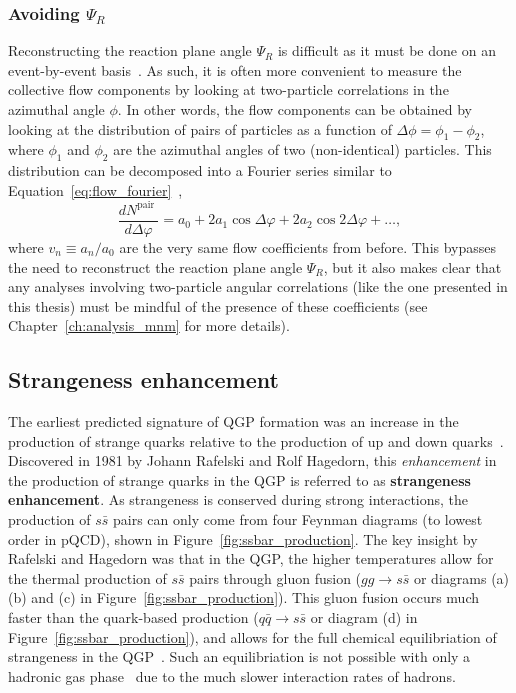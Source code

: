 \subsubsection{Avoiding $\Psi_R$}
\label{sec:v2_twoparticle}
Reconstructing the reaction plane angle $\Psi_R$ is difficult as it must be done on an event-by-event basis~\cite{ReactionPlane}. As such, it is often more convenient to measure the collective flow components by looking at two-particle correlations in the azimuthal angle $\phi$. In other words, the flow components can be obtained by looking at the distribution of pairs of particles as a function of $\Delta\phi = \phi_1 - \phi_2$, where $\phi_1$ and $\phi_2$ are the azimuthal angles of two (non-identical) particles. This distribution can be decomposed into a Fourier series similar to Equation~\ref{eq:flow_fourier}~\cite{FlowDphi}, 
%
\begin{equation}
    \label{eq:flow_dphi}
    \frac{d N^{\text {pair }}}{d \Delta \varphi}=a_0+2 a_1 \cos \Delta \varphi+2 a_2 \cos 2 \Delta \varphi+\ldots,
\end{equation}
where $v_n \equiv a_n/a_0$ are the very same flow coefficients from before. This bypasses the need to reconstruct the reaction plane angle $\Psi_R$, but it also makes clear that any analyses involving two-particle angular correlations (like the one presented in this thesis) must be mindful of the presence of these coefficients (see Chapter~\ref{ch:analysis_mnm} for more details).


\subsection{Strangeness enhancement}
\label{sec:strangeness_enhancement}

The earliest predicted signature of QGP formation was an increase in the production of strange quarks relative to the production of up and down quarks~\cite{Strangeness}. Discovered in 1981 by Johann Rafelski and Rolf Hagedorn, this \textit{enhancement} in the production of strange quarks in the QGP is referred to as \textbf{strangeness enhancement}. As strangeness is conserved during strong interactions, the production of $s\bar{s}$ pairs can only come from four Feynman diagrams (to lowest order in pQCD), shown in Figure~\ref{fig:ssbar_production}. The key insight by Rafelski and Hagedorn was that in the QGP, the higher temperatures allow for the thermal production of $s\bar{s}$ pairs through gluon fusion ($gg \rightarrow s\bar{s}$ or diagrams (a) (b) and (c) in Figure~\ref{fig:ssbar_production}). This gluon fusion occurs much faster than the quark-based production ($q\bar{q} \rightarrow s\bar{s}$ or diagram (d) in Figure~\ref{fig:ssbar_production}), and allows for the full chemical equilibriation of strangeness in the QGP~\cite{QGPEquil}. Such an equilibriation is not possible with only a hadronic gas phase~\cite{HadronGasEquil} due to the much slower interaction rates of hadrons.

